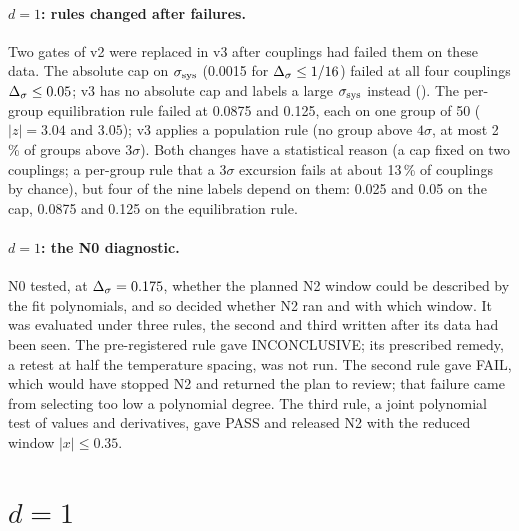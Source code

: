 \paragraph{$d=1$: rules changed after failures.} Two gates of v2 were replaced in v3 after couplings had failed them on these data. The
absolute cap on $\sigma_{\rm sys}$ (0.0015 for $\Delta_\sigma\le1/16$) failed at all four couplings $\Delta_\sigma\le0.05$; v3 has no absolute cap and labels a large $\sigma_{\rm sys}$
instead (). The per-group equilibration rule failed at 0.0875 and 0.125, each on one group of 50 ($|z|=3.04$ and
$3.05$); v3 applies a population rule (no group above $4\sigma$, at most 2\,\% of groups above $3\sigma$). Both changes have a statistical
reason (a cap fixed on two couplings; a per-group rule that a $3\sigma$ excursion fails at about 13\,\% of couplings by chance), but four of the
nine  labels depend on them: 0.025 and 0.05 on the cap, 0.0875 and 0.125 on the equilibration rule.

\paragraph{$d=1$: the N0 diagnostic.} N0 tested, at $\Delta_\sigma=0.175$, whether the planned N2 window could be described by the fit polynomials, and
so decided whether N2 ran and with which window. It was evaluated under three rules, the second and third written after its data had been
seen. The pre-registered rule gave INCONCLUSIVE; its prescribed remedy, a retest at half the temperature spacing, was not run. The second
rule gave FAIL, which would have stopped N2 and returned the plan to review; that failure came from selecting too low a polynomial degree. The
third rule, a joint polynomial test of values and derivatives, gave PASS and released N2 with the reduced window $|x|\le0.35$.

\section{\texorpdfstring{$d=1$}{d=1}}\label{mc:sec:1d}
